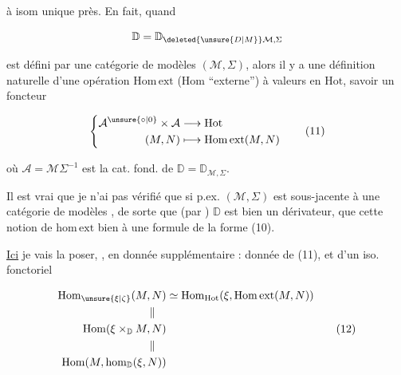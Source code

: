 
à isom unique près. En fait, quand

\[\mathbb D=\mathbb D_{\deleted{\unsure{D|M}}\mathcal M,\Sigma}\]

est défini par une catégorie de modèles $(\mathcal M,\Sigma)$, alors il y a une définition naturelle  d'une opération $\mathrm{Hom\,ext}$ (Hom ``externe'') à valeurs en $\mathrm{Hot}$,  savoir un foncteur

\[
\left\{\begin{aligned}
\mathcal A^{\unsure{\circ|0}}\times\mathcal A&\longrightarrow\mathrm{Hot}\\
(M,N)&\longmapsto\mathrm{Hom\,ext}(M,N)
\end{aligned}\right.\tag*{(11)}
\]

où $\mathcal A=\mathcal M\Sigma^{-1}$ est la cat. fond. de $\mathbb D=\mathbb D_{\mathcal M,\Sigma}$.

 Il est vrai que je n'ai pas vérifié que si p.ex. $(\mathcal M,\Sigma)$ est sous-jacente à une catégorie de modèles , de sorte que (par ) $\mathbb D$ est bien un dérivateur, que cette notion de $\mathrm{hom\,ext}$  bien à une formule de la forme (10).

\uline{Ici} je vais la poser,  , en donnée  supplémentaire : donnée de (11), et d'un iso. fonctoriel

\[
\begin{aligned}
\mathrm{Hom}_{\unsure{\xi|\zeta}}(M,N)&\simeq\mathrm{Hom}_{\mathrm{Hot}}(\xi,\mathrm{Hom\,ext}(M,N))\\
\mathrel{\Vert}\hspace{1em}&\\
\mathrm{Hom}(\xi\times_{\mathbb D}M,N)&\\
\mathrel{\Vert}\hspace{1em}&\\
\mathrm{Hom}(M,\mathrm{hom}_{\mathbb D}(\xi,N))&
\end{aligned}\tag*{(12)}
\]

